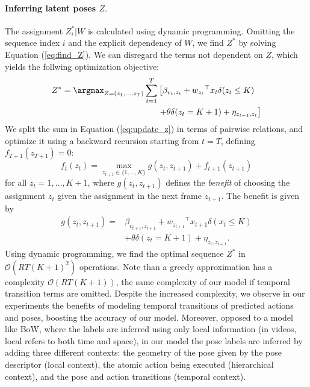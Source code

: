 \paragraph{\textbf{Inferring latent poses $Z.$}}
%
The assignment $Z_i^* | W$ is calculated
using dynamic programming. Omitting the sequence index $i$ and the explicit dependency of $W$,
we find $Z^*$ by solving Equation (\ref{eq:find_Z}).
We can disregard the terms not dependent on $Z$, which yields the follwing
optimization objective:
\begin{equation}
\label{eq:update_z}
\begin{split}
  Z^* = \argmax_{Z=(z_1,\dots,z_T)} \sum_{t=1}^T & \left[ \beta_{v_{t},z_t} +  {w_{z_t}}^\top x_{t}\delta(z_t \le K)   \right. \\ &  \left.+ \vphantom{{w_{z_t}}^\top} \theta \delta(z_t = K+1) + \eta_{z_{t-1},z_t} \right]
\end{split}
\end{equation}
We split the sum in Equation (\ref{eq:update_z}) in terms of pairwise relations, and optimize it using a backward recursion starting from $t=T$, defining $f_{T+1}(z_{T+1}) = 0$: 
\begin{equation}
f_t(z_t) = \max_{z_{t+1} \in \{1,\dots,K\}} g(z_t,z_{t+1}) + f_{t+1}(z_{t+1})
\end{equation}
for all $z_t = 1,\dots,K+1$, where $g(z_t,z_{t+1})$ defines the \emph{benefit} of choosing the
assignment $z_{t}$ given the assignment in the next frame $z_{t+1}$.
The benefit is given by
\begin{equation}
\begin{split}
g(z_t,z_{t+1}) = &\beta_{v_{t+1},z_{t+1}} +  {w_{z_{t+1}}}^\top x_{t+1}\delta(x_t \le K) \\ &+ \theta \delta(z_t = K+1) + \eta_{z_t,z_{t+1}} .
\end{split}
\end{equation}
Using dynamic programming, we find the optimal sequence $Z^*$ in $\mathcal{O}(RT(K+1)^2)$ operations.
Note than a greedy approximation has a complexity $\mathcal{O}(RT(K+1))$, the same complexity of our model if temporal transition terms are omitted.  
Despite the increased complexity, we observe in our experiments the benefits of modeling temporal transitions of predicted actions and poses,  boosting the accuracy of our model. Moreover, opposed to a model like BoW, where the labels are inferred using only local information (in videos, local refers to both time and space), in our model the pose labels are inferred by adding three different contexts: the geometry of the pose given by the pose descriptor (local context), the atomic action being executed (hierarchical context), and the pose and action transitions (temporal context).

